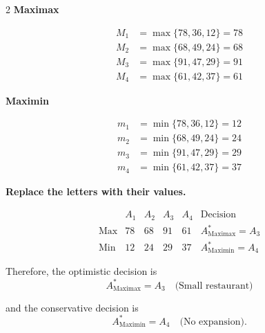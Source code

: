 {\begin{multicols}{2}
			\textbf{Maximax}
			
			\[
			\begin{array}{ll}
				M_1 &= \max\{78,36,12\}=78\\
				M_2 &= \max\{68,49,24\}=68\\
				M_3 &= \max\{91,47,29\}=91\\
				M_4 &= \max\{61,42,37\}=61
			\end{array}
			\]
			
			\textbf{Maximin}
			
			\[
			\begin{array}{ll}
				m_1 &= \min\{78,36,12\}=12\\
				m_2 &= \min\{68,49,24\}=24\\
				m_3 &= \min\{91,47,29\}=29\\
				m_4 &= \min\{61,42,37\}=37
			\end{array}
			\]
			
			\columnbreak
			
			\textbf{Replace the letters with their values.}
			
			\[
			\begin{array}{c|ccccc}
				& A_1 & A_2 & A_3 & A_4 & \text{Decision}\\
				\hline
				\text{Max} &
				78 & 68 & 91 & 61 &
				A^*_{\mathrm{Maximax}}=A_3
				\\
				\text{Min} &
				12 & 24 & 29 & 37 &
				A^*_{\mathrm{Maximin}}=A_4
			\end{array}
			\]
			
			Therefore, the optimistic decision is
			\[
			A^*_{\mathrm{Maximax}}=A_3
			\quad\text{(Small restaurant)}
			\]
			
			and the conservative decision is
			\[
			A^*_{\mathrm{Maximin}}=A_4
			\quad\text{(No expansion)}.
			\]
			
		\end{multicols}
	}
	
